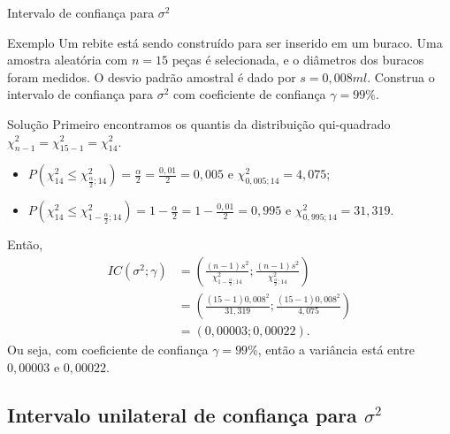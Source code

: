 \documentclass[8pt]{beamer}
\begin{document}
\begin{frame}{Intervalo de confiança para $\sigma^2$}

\small

\begin{block}{Exemplo}
	Um rebite está sendo construído para ser inserido em um buraco. Uma amostra aleatória com $n=15$ peças é selecionada, e o diâmetros dos buracos foram medidos. O desvio padrão amostral é dado por $s=0,008 ml$. Construa o intervalo de confiança para $\sigma^2$ com coeficiente de confiança $\gamma=99\%$.
\end{block}

\begin{block}{Solução}
	Primeiro encontramos os quantis da distribuição qui-quadrado $\chi^2_{n-1} = \chi^2_{15-1}=\chi^2_{14}$. 
	\begin{itemize}
		\item $P\left(\chi^2_{14} \leq \chi^2_{\frac{\alpha}{2}; 14}\right) = \frac{\alpha}{2} = \frac{0,01}{2} = 0,005$ e $\chi^2_{0,005; 14}=4,075$;
		\item $P\left(\chi^2_{14} \leq \chi^2_{1 - \frac{\alpha}{2}; 14}\right) = 1 - \frac{\alpha}{2} = 1 - \frac{0,01}{2} = 0,995$ e $\chi^2_{0,995; 14}=31,319$. 
	\end{itemize}
	Então,
	\begin{align*}
		IC(\sigma^2; \gamma) &= \left( \frac{(n-1)s^2}{\chi^2_{1-\frac{\alpha}{2}; 14}}; \frac{(n-1)s^2}{\chi^2_{\frac{\alpha}{2}; 14}} \right)\\
		&= \left( \frac{(15-1)0,008^2}{31,319}; \frac{(15-1)0,008^2}{4,075} \right) \\
		&= \left( 0,00003; 0,00022 \right).
	\end{align*}	
	Ou seja, com coeficiente de confiança $\gamma=99\%$, então a variância está entre $0,00003$ e $0,00022$.
	
\end{block}

\normalsize

\end{frame}

\subsection{Intervalo unilateral de confiança para $\sigma^2$}
\end{document}
